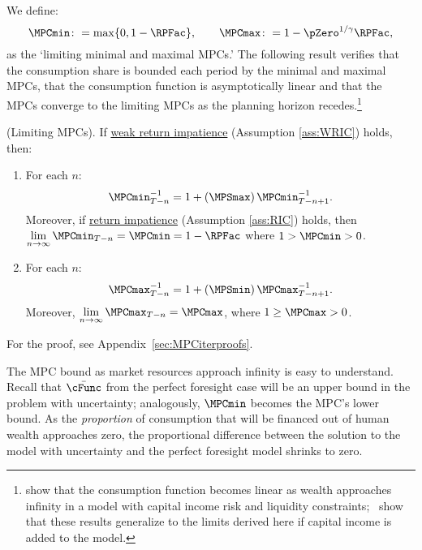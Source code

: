 \documentclass[BufferStockTheory]{subfiles}
\begin{document}
We define:
%
\hypertarget{MPCmaxDefn}{}\hypertarget{MPCminDefn}{}
\begin{equation}\label{eq:MPCminmaxdefn}
\MPCmin \colon = \max\{0,1- \RPFac\}, \qquad \MPCmax \colon = 1 - \pZero^{1/\gamma}\RPFac,
\end{equation}
as the `limiting minimal and maximal MPCs.' The following result verifies that the consumption share is bounded each period by the minimal and maximal MPCs, that the consumption function is asymptotically linear and that the MPCs converge to the limiting MPCs as the planning horizon recedes.\footnote{\cite{benhabibWealth} show that the consumption function becomes linear as wealth approaches infinity in a model with capital income risk and liquidity constraints;~\cite{maTodaRich} show that these results generalize to the limits derived here if capital income is added to the model.} 
\hypertarget{cFuncBounds}{}

\begin{lemma}(Limiting MPCs). \label{lemm:MPC}
If \hyperlink{WRIC}{weak return impatience} (Assumption \ref{ass:WRIC}) holds, then:

\begin{enumerate}[label=(\roman*)]
\item For each $n$:
%
\begin{equation}\label{eq:MPCminInv}
\MPCmin_{T-n}^{-1}  = 1+\left(\MPSmax\right) \MPCmin_{T-n+1}^{-1}.
\end{equation}
Moreover, if \hyperlink{RIC}{return impatience} (Assumption \ref{ass:RIC}) holds, then $\lim\limits_{n \rightarrow  \infty}\MPCmin_{T-n} = \MPCmin = 1- \RPFac$ where  $1> \MPCmin>0$. 
\item  For each $n$:
\begin{equation}\label{eq:MPCmaxInv}
\MPCmax_{T-n}^{-1}   = 1+\left(\MPSmin\right) \MPCmax_{T-n+1}^{-1}.
\end{equation}
Moreover, $\lim\limits_{n \rightarrow \infty }\MPCmax_{T-n} = \MPCmax$, where $1 \geq \MPCmax > 0$. 
\end{enumerate}
\end{lemma}

For the proof, see  Appendix~\ref{sec:MPCiterproofs}. 

The MPC bound as market resources approach infinity is easy to understand.  Recall that $\bar{\cFunc}$ from the perfect foresight case will be an upper bound in the problem with uncertainty; analogously, $\MPCmin$ becomes the MPC's lower bound. As the \textit{proportion} of consumption that will be financed out of human wealth approaches zero, the proportional difference between the solution to the model with uncertainty and the perfect foresight model shrinks to zero. 
\end{document}
